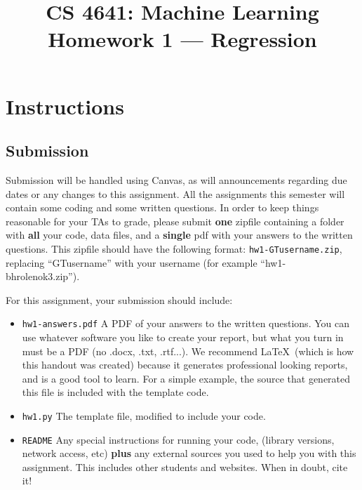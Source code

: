 \documentclass{article} %
\title{CS 4641: Machine Learning\\ %
Homework 1 --- Regression}
\date{} %
\author{}
\begin{document}
\maketitle %

\newcommand{\bphnote}[1]{\textit{\textcolor{red}{#1}}}


\section*{Instructions} %
\subsection*{Submission}
Submission will be handled using Canvas, as will announcements regarding due dates or any changes to this assignment. 
All the assignments this semester will contain some coding and some written questions. In order to keep things reasonable for 
your TAs to grade, please submit \textbf{one} zipfile containing a folder with \textbf{all} your code, data files, and a 
\textbf{single} pdf with your answers to the written questions. This zipfile should have the following format: 
\texttt{hw1-GTusername.zip}, replacing ``GTusername'' with your username (for example ``hw1-bhrolenok3.zip'').

For this assignment, your submission should include:
\begin{itemize}
	\item \texttt{hw1-answers.pdf} A PDF of your answers to the written questions. You can use whatever software you like to create your report, but what you turn in must be a PDF (no .docx, .txt, .rtf...). We recommend \LaTeX~(which is how this handout was created) because it generates professional looking reports, and is a good tool to learn. For a simple example, the source that generated this file is included with the template code.
	\item \texttt{hw1.py} The template file, modified to include your code.
	\item \texttt{README} Any special instructions for running your code, (library versions, network access, etc) \textbf{plus}
	any external sources you used to help you with this assignment. This includes other students and websites. When in doubt, cite it!
\end{itemize}
\end{document}
